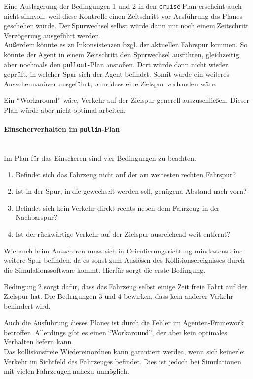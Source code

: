 Eine Auslagerung der Bedingungen 1 und 2 in den \texttt{cruise}-Plan erscheint auch nicht sinnvoll, weil diese Kontrolle einen Zeitschritt vor Ausführung des Planes geschehen würde.
Der Spurwechsel selbst würde dann mit noch einem Zeitschritt Verzögerung ausgeführt werden.
\\
Außerdem könnte es zu Inkonsistenzen bzgl. der aktuellen Fahrspur kommen.
So könnte der Agent in einem Zeitschritt den Spurwechsel ausführen, gleichzeitig aber nochmals den \texttt{pullout}-Plan anstoßen.
Dort würde dann nicht wieder geprüft, in welcher Spur sich der Agent befindet.
Somit würde ein weiteres Ausschermanöver ausgeführt, ohne dass eine Zielspur vorhanden wäre.

Ein \enquote{Workaround} wäre, Verkehr auf der Zielspur generell auszuschließen.
Dieser Plan würde aber nicht optimal arbeiten. 



\paragraph*{Einscherverhalten im \texttt{pullin}-Plan}
\hfill \\
Im Plan für das Einscheren sind vier Bedingungen zu beachten.

\begin{enumerate}
	\itemsep0em
	\item Befindet sich das Fahrzeug nicht auf der am weitesten rechten Fahrspur?
	\item Ist in der Spur, in die gewechselt werden soll, genügend Abstand nach vorn?
	\item Befindet sich kein Verkehr direkt rechts neben dem Fahrzeug in der Nachbarspur?
	\item Ist der rückwärtige Verkehr auf der Zielspur ausreichend weit entfernt?
\end{enumerate}

Wie auch beim Ausscheren muss sich in Orientierungsrichtung mindestens eine weitere Spur befinden, da es sonst zum Auslösen des Kollisionsereignisses durch die Simulationssoftware kommt.
Hierfür sorgt die erste Bedingung.

Bedingung 2 sorgt dafür, dass das Fahrzeug selbst einige Zeit freie Fahrt auf der Zielspur hat.
Die Bedingungen 3 und 4 bewirken, dass kein anderer Verkehr behindert wird. 

Auch die Ausführung dieses Planes ist durch die Fehler im Agenten-Framework betroffen. Allerdings gibt es einen \enquote{Workaround}, der aber kein optimales Verhalten liefern kann.
\\
Das kollisionsfreie Wiedereinordnen kann garantiert werden, wenn sich keinerlei Verkehr im Sichtfeld des Fahrzeuges befindet.
Dies ist jedoch bei Simulationen mit vielen Fahrzeugen nahezu unmöglich.



